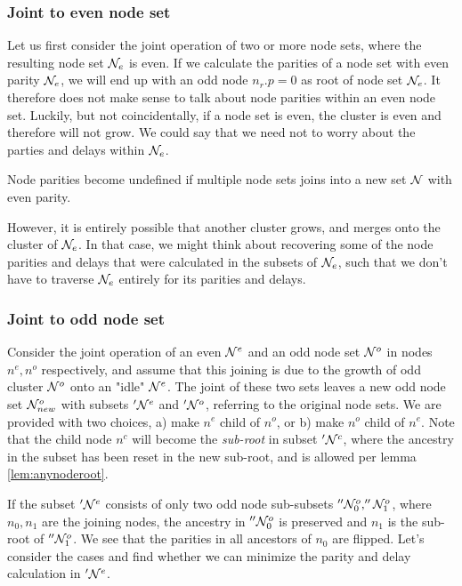 \subsubsection{Joint to even node set}

Let us first consider the joint operation of two or more node sets, where the resulting node set $\mathcal{N}_{e}$ is even. If we calculate the parities of a node set with even parity $\mathcal{N}_e$, we will end up with an odd node $n_r.p=0$ as root of node set $\mathcal{N}_e$. It therefore does not make sense to talk about node parities within an even node set. Luckily, but not coincidentally, if a node set is even, the cluster is even and therefore will not grow. We could say that we need not to worry about the parties and delays within $\mathcal{N}_{e}$.

\begin{lemma}\label{lem:nodecalc_even}
  Node parities become undefined if multiple node sets joins into a new set $\mathcal{N}$ with even parity.
\end{lemma}

However, it is entirely possible that another cluster grows, and merges onto the cluster of $\mathcal{N}_{e}$. In that case, we might think about recovering some of the node parities and delays that were calculated in the subsets of $\mathcal{N}_e$, such that we don't have to traverse $\mathcal{N}_{e}$ entirely for its parities and delays.

\subsubsection{Joint to odd node set}

Consider the joint operation of an even $\mathcal{N}^e$ and an odd node set $\mathcal{N}^o$ in nodes $n^e, n^o$ respectively, and assume that this joining is due to the growth of odd cluster $\mathcal{N}^o$ onto an "idle" $\mathcal{N}^e$. The joint of these two sets leaves a new odd node set $\mathcal{N}_{new}^o$ with subsets $'\mathcal{N}^e$ and $'\mathcal{N}^o$, referring to the original node sets. We are provided with two choices, a) make $n^e$ child of $n^o$, or b) make $n^o$ child of $n^e$. Note that the child node $n^c$ will become the \emph{sub-root} in subset $'\mathcal{N}^c$, where the ancestry in the subset has been reset in the new sub-root, and is allowed per lemma \ref{lem:anynoderoot}.

If the subset $'\mathcal{N}^e$ consists of only two odd node sub-subsets $''\mathcal{N}^o_0, ''\mathcal{N}^o_1$, where $n_0, n_1$ are the joining nodes, the ancestry in $''\mathcal{N}^o_0$ is preserved and $n_1$ is the sub-root of $''\mathcal{N}^o_1$. We see that the parities in all ancestors of $n_0$ are flipped. Let's consider the cases and find whether we can minimize the parity and delay calculation in $'\mathcal{N}^{e}$.

